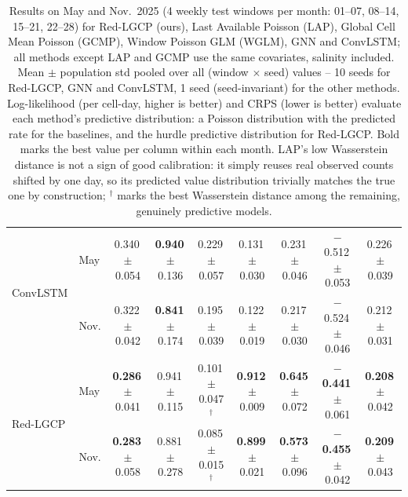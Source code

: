 \begin{table}[t]
\begin{tabular}{llccccccc}
\midrule
\multirow{2}{*}{ConvLSTM} & May & 0.340\,{\scriptsize$\pm$0.054} & \textbf{0.940}\,{\scriptsize$\pm$0.136} & 0.229\,{\scriptsize$\pm$0.057} & 0.131\,{\scriptsize$\pm$0.030} & 0.231\,{\scriptsize$\pm$0.046} & $-$0.512\,{\scriptsize$\pm$0.053} & 0.226\,{\scriptsize$\pm$0.039} \\
 & Nov. & 0.322\,{\scriptsize$\pm$0.042} & \textbf{0.841}\,{\scriptsize$\pm$0.174} & 0.195\,{\scriptsize$\pm$0.039} & 0.122\,{\scriptsize$\pm$0.019} & 0.217\,{\scriptsize$\pm$0.030} & $-$0.524\,{\scriptsize$\pm$0.046} & 0.212\,{\scriptsize$\pm$0.031} \\
\midrule
\multirow{2}{*}{Red-LGCP} & May & \textbf{0.286}\,{\scriptsize$\pm$0.041} & 0.941\,{\scriptsize$\pm$0.115} & 0.101\,{\scriptsize$\pm$0.047}$^{\boldsymbol{\dagger}}$ & \textbf{0.912}\,{\scriptsize$\pm$0.009} & \textbf{0.645}\,{\scriptsize$\pm$0.072} & \textbf{$-$0.441}\,{\scriptsize$\pm$0.061} & \textbf{0.208}\,{\scriptsize$\pm$0.042} \\
 & Nov. & \textbf{0.283}\,{\scriptsize$\pm$0.058} & 0.881\,{\scriptsize$\pm$0.278} & 0.085\,{\scriptsize$\pm$0.015}$^{\boldsymbol{\dagger}}$ & \textbf{0.899}\,{\scriptsize$\pm$0.021} & \textbf{0.573}\,{\scriptsize$\pm$0.096} & \textbf{$-$0.455}\,{\scriptsize$\pm$0.042} & \textbf{0.209}\,{\scriptsize$\pm$0.043} \\
\bottomrule
\end{tabular}
\caption{Results on May and Nov.\ 2025 (4 weekly test windows per month: 01--07, 08--14, 15--21, 22--28) for Red-LGCP (ours), Last Available Poisson (LAP), Global Cell Mean Poisson (GCMP), Window Poisson GLM (WGLM), GNN and ConvLSTM; all methods except LAP and GCMP use the same covariates, salinity included. Mean $\pm$ population std pooled over all (window $\times$ seed) values -- 10 seeds for Red-LGCP, GNN and ConvLSTM, 1 seed (seed-invariant) for the other methods. Log-likelihood (per cell-day, higher is better) and CRPS (lower is better) evaluate each method's predictive distribution: a Poisson distribution with the predicted rate for the baselines, and the hurdle predictive distribution for Red-LGCP. Bold marks the best value per column within each month. LAP's low Wasserstein distance is not a sign of good calibration: it simply reuses real observed counts shifted by one day, so its predicted value distribution trivially matches the true one by construction; $^{\boldsymbol{\dagger}}$ marks the best Wasserstein distance among the remaining, genuinely predictive models.}
\label{tab:results-main}
\end{table}
